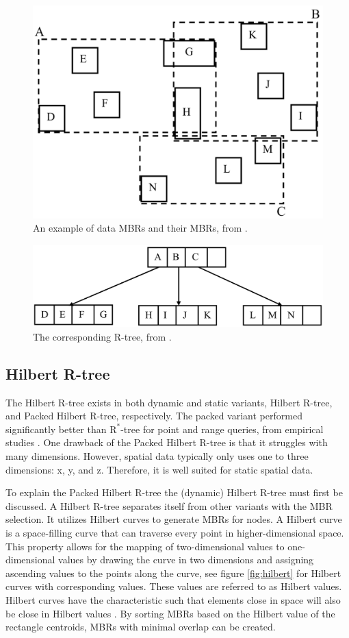 \begin{figure}
    \centering
    \includegraphics[width=0.5\linewidth]{./figures/mbrs.png}
    \caption{An example of data MBRs and their MBRs, from \cite{rtree}.}
    \label{fig:mbrs}
\end{figure}
\begin{figure}
    \centering
    \includegraphics[width=\linewidth]{./figures/rtree.png}
    \caption{The corresponding R-tree, from \cite{rtree}.}
    \label{fig:rtree}
\end{figure}

\subsection{Hilbert R-tree}
The Hilbert R-tree exists in both dynamic and static variants, Hilbert R-tree, and Packed Hilbert R-tree, respectively. The packed variant performed significantly better than $\text{R}^*$-tree for point and range queries, from empirical studies \cite{rtree}. One drawback of the Packed Hilbert R-tree is that it struggles with many dimensions. However, spatial data typically only uses one to three dimensions: x, y, and z. Therefore, it is well suited for static spatial data.

To explain the Packed Hilbert R-tree the (dynamic) Hilbert R-tree must first be discussed. A Hilbert R-tree separates itself from other variants with the MBR selection. It utilizes Hilbert curves to generate MBRs for nodes. A Hilbert curve is a space-filling curve that can traverse every point in higher-dimensional space. This property allows for the mapping of two-dimensional values to one-dimensional values by drawing the curve in two dimensions and assigning ascending values to the points along the curve, see figure \ref{fig:hilbert} for Hilbert curves with corresponding values. These values are referred to as Hilbert values. Hilbert curves have the characteristic such that elements close in space will also be close in Hilbert values \cite{rtree}. By sorting MBRs based on the Hilbert value of the rectangle centroids, MBRs with minimal overlap can be created.

